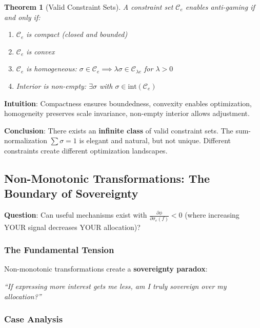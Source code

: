 \documentclass[11pt,a4paper]{article}
\newtheorem{theorem}{Theorem}[section]
\theoremstyle{definition}
\theoremstyle{remark}
\begin{document}
\begin{theorem}[Valid Constraint Sets]
A constraint set $\mathcal{C}_e$ enables anti-gaming if and only if:
\begin{enumerate}
\item $\mathcal{C}_e$ is compact (closed and bounded)
\item $\mathcal{C}_e$ is convex
\item $\mathcal{C}_e$ is homogeneous: $\sigma \in \mathcal{C}_e \implies \lambda\sigma \in \mathcal{C}_{\lambda e}$ for $\lambda > 0$
\item Interior is non-empty: $\exists \sigma$ with $\sigma \in \text{int}(\mathcal{C}_e)$
\end{enumerate}
\end{theorem}

\textbf{Intuition}: Compactness ensures boundedness, convexity enables optimization, homogeneity preserves scale invariance, non-empty interior allows adjustment.

\textbf{Conclusion}: There exists an \textbf{infinite class} of valid constraint sets. The sum-normalization $\sum \sigma = 1$ is elegant and natural, but not unique. Different constraints create different optimization landscapes.

\subsection{Non-Monotonic Transformations: The Boundary of Sovereignty}
\label{sec:non-monotonic}

\textbf{Question}: Can useful mechanisms exist with $\frac{\partial \phi}{\partial \sigma_e(f)} < 0$ (where increasing YOUR signal decreases YOUR allocation)?

\subsubsection{The Fundamental Tension}

Non-monotonic transformations create a \textbf{sovereignty paradox}:

\begin{center}
\textit{``If expressing more interest gets me less, am I truly sovereign over my allocation?''}
\end{center}

\subsubsection{Case Analysis}
\end{document}
